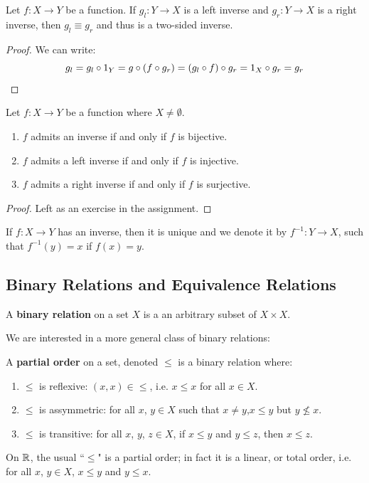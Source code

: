 \begin{propbox}
   Let $f \colon X \to Y$ be a function. If $g_l \colon Y \to X$ is a left inverse and $g_r \colon Y \to X$ is a right inverse, then $g_l \equiv g_r$ and thus is a two-sided inverse.
\end{propbox}

\begin{proof}
   We can write:
   \[ g_l = g_l \circ \text{1}_Y = g \circ (f \circ g_r) = (g_l \circ f) \circ g_r = \text{1}_X \circ g_r = g_r \qedhere \] 
\end{proof}

\begin{propbox}
   Let $f \colon X \to Y$ be a function where $X \neq \emptyset$. 
   \begin{enumerate}
      \item $f$ admits an inverse if and only if $f$ is bijective.
      \item $f$ admits a left inverse if and only if $f$ is injective.
      \item $f$ admits a right inverse if and only if $f$ is surjective.
   \end{enumerate}
\end{propbox}
\begin{proof}
   Left as an exercise in the assignment. 
\end{proof}

\begin{remark}
   If $f \colon X \to Y$ has an inverse, then it is unique and we denote it by $f^{-1} \colon Y \to X$, such that $f^{-1}(y) = x$ if $f(x) = y$. 
\end{remark}

\subsection{Binary Relations and Equivalence Relations}

\begin{defbox}
  A \textbf{binary relation} on a set $X$ is a an arbitrary subset of $X \times X$. 
\end{defbox}

We are interested in a more general class of binary relations:

\begin{defbox}
   A \textbf{partial order} on a set, denoted $\leq$ is a binary relation where:
   \begin{enumerate}
      \item $\leq$ is reflexive: $(x,x) \in \leq$, i.e. $x \leq x$ for all $x \in X$.
      \item $\leq$ is assymmetric: for all $x$, $y \in X$ such that $x \neq y$,$x \leq y$ but $y \not\leq x$.
      \item $\leq$ is transitive: for all $x$, $y$, $z \in X$, if $x \leq y$ and $y \leq z$, then $x \leq z$.
   \end{enumerate}
\end{defbox}
\begin{remark}
   On $\mathbb{R}$, the usual ``$\leq$" is a partial order; in fact it is a linear, or total order, i.e. for all $x$, $y \in X$, $x \leq y$ and $y \leq x$. 
\end{remark}

